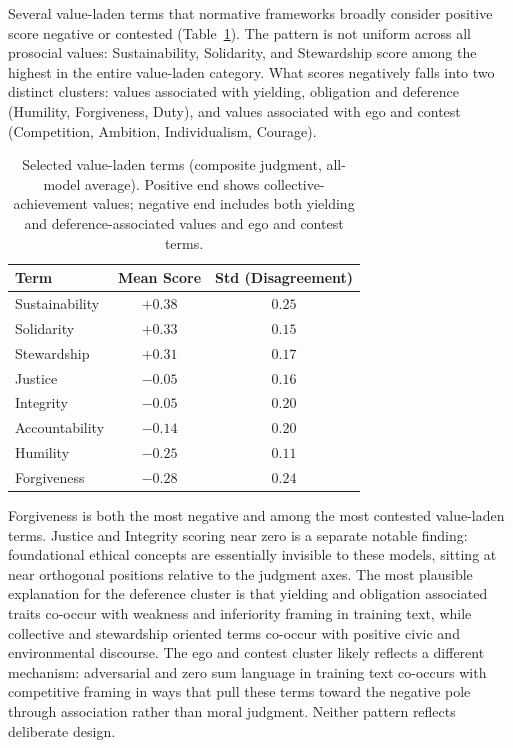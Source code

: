 \documentclass[11pt, letterpaper]{article}
\begin{document}
Several value-laden terms that normative frameworks broadly consider positive score negative or contested (Table~\ref{tab:value_terms}). The pattern is not uniform across all prosocial values: Sustainability, Solidarity, and Stewardship score among the highest in the entire value-laden category. What scores negatively falls into two distinct clusters: values associated with yielding, obligation and deference (Humility, Forgiveness, Duty), and values associated with ego and contest (Competition, Ambition, Individualism, Courage).

\begin{table}[H]
  \centering
  \begin{tabular}{lcc}
    \toprule
    \textbf{Term} & \textbf{Mean Score} & \textbf{Std (Disagreement)} \\
    \midrule
    Sustainability & $+0.38$ & $0.25$ \\
    Solidarity     & $+0.33$ & $0.15$ \\
    Stewardship    & $+0.31$ & $0.17$ \\
    Justice        & $-0.05$ & $0.16$ \\
    Integrity      & $-0.05$ & $0.20$ \\
    Accountability & $-0.14$ & $0.20$ \\
    Humility       & $-0.25$ & $0.11$ \\
    Forgiveness    & $-0.28$ & $0.24$ \\
    \bottomrule
  \end{tabular}
  \caption{Selected value-laden terms (composite judgment, all-model average).
    Positive end shows collective-achievement values; negative end includes
  both yielding and deference-associated values and ego and contest terms.}
  \label{tab:value_terms}
\end{table}

Forgiveness is both the most negative and among the most contested value-laden terms. Justice and Integrity scoring near zero is a separate notable finding: foundational ethical concepts are essentially invisible to these models, sitting at near orthogonal positions relative to the judgment axes. The most plausible explanation for the deference cluster is that yielding and obligation associated traits co-occur with weakness and inferiority framing in training text, while collective and stewardship oriented terms co-occur with positive civic and environmental discourse. The ego and contest cluster likely reflects a different mechanism: adversarial and zero sum language in training text co-occurs with competitive framing in ways that pull these terms toward the negative pole through association rather than moral judgment. Neither pattern reflects deliberate design.
\end{document}
